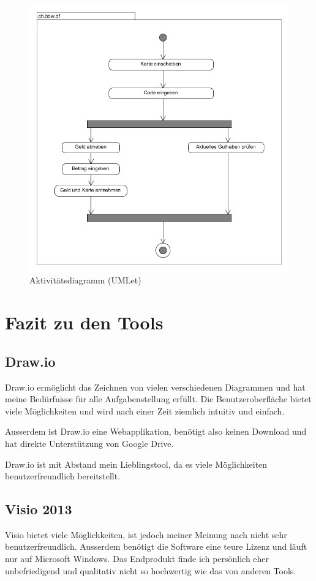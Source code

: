 \documentclass[a4paper, titlepage]{scrartcl}
\begin{document}
    \begin{figure}
        \includegraphics[width=\textwidth]{Aktivitaetsdiagramm1b.png}
        \caption{Aktivitätsdiagramm (UMLet)}
        \label{AktivitaetsdiagrammUmlet}
    \end{figure}

    \section{Fazit zu den Tools}
    \subsection{Draw.io}
    Draw.io ermöglicht das Zeichnen von vielen verschiedenen Diagrammen und
    hat meine Bedürfnisse für alle Aufgabenstellung erfüllt. Die Benutzeroberfläche
    bietet viele Möglichkeiten und wird nach einer Zeit ziemlich intuitiv und einfach.
    
    Ausserdem ist Draw.io eine Webapplikation, benötigt also keinen Download und
    hat direkte Unterstützung von Google Drive. 
    
    Draw.io ist mit Abstand mein Lieblingstool, da es viele Möglichkeiten benutzerfreundlich
    bereitstellt.
    
    \subsection{Visio 2013}
    Visio bietet viele Möglichkeiten, ist jedoch meiner Meinung nach nicht
    sehr benutzerfreundlich. Ausserdem benötigt die Software eine teure Lizenz
    und läuft nur auf Microsoft Windows. Das Endprodukt finde ich persönlich
    eher unbefriedigend und qualitativ nicht so hochwertig wie das von anderen Tools.
\end{document}
